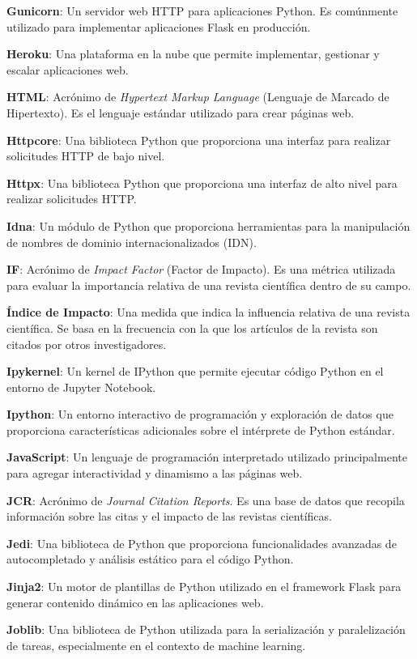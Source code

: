 \textbf{Gunicorn}: Un servidor web HTTP para aplicaciones Python. Es comúnmente utilizado para implementar aplicaciones Flask en producción.

\textbf{Heroku}: Una plataforma en la nube que permite implementar, gestionar y escalar aplicaciones web.

\textbf{HTML}: Acrónimo de \textit{Hypertext Markup Language} (Lenguaje de Marcado de Hipertexto). Es el lenguaje estándar utilizado para crear páginas web.

\textbf{Httpcore}: Una biblioteca Python que proporciona una interfaz para realizar solicitudes HTTP de bajo nivel.

\textbf{Httpx}: Una biblioteca Python que proporciona una interfaz de alto nivel para realizar solicitudes HTTP.

\textbf{Idna}: Un módulo de Python que proporciona herramientas para la manipulación de nombres de dominio internacionalizados (IDN).

\textbf{IF}: Acrónimo de \textit{Impact Factor} (Factor de Impacto). Es una métrica utilizada para evaluar la importancia relativa de una revista científica dentro de su campo.

\textbf{Índice de Impacto}: Una medida que indica la influencia relativa de una revista científica. Se basa en la frecuencia con la que los artículos de la revista son citados por otros investigadores.

\textbf{Ipykernel}: Un kernel de IPython que permite ejecutar código Python en el entorno de Jupyter Notebook.

\textbf{Ipython}: Un entorno interactivo de programación y exploración de datos que proporciona características adicionales sobre el intérprete de Python estándar.

\textbf{JavaScript}: Un lenguaje de programación interpretado utilizado principalmente para agregar interactividad y dinamismo a las páginas web.

\textbf{JCR}: Acrónimo de \textit{Journal Citation Reports}. Es una base de datos que recopila información sobre las citas y el impacto de las revistas científicas.

\textbf{Jedi}: Una biblioteca de Python que proporciona funcionalidades avanzadas de autocompletado y análisis estático para el código Python.

\textbf{Jinja2}: Un motor de plantillas de Python utilizado en el framework Flask para generar contenido dinámico en las aplicaciones web.

\textbf{Joblib}: Una biblioteca de Python utilizada para la serialización y paralelización de tareas, especialmente en el contexto de machine learning.

